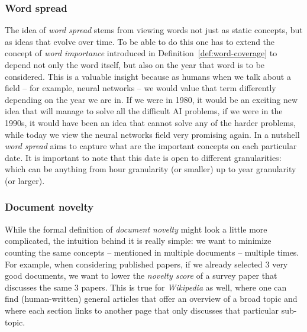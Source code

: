 \subsubsection{Word spread}

The idea of \emph{word spread} stems from viewing words not just as static
concepts, but as ideas that evolve over time.
To be able to do this one has to extend the concept of \emph{word importance}
introduced in Definition~\vref{def:word-coverage} to depend not only the word
itself, but also on the year that word is to be considered.
This is a valuable insight because as humans when we talk about a field -- for
example, neural networks -- we would value that term differently depending on
the year we are in. If we were in 1980, it would be an exciting new idea that
will manage to solve all the difficult \acl{AI} problems, if we were in the
1990s, it would have been an idea that cannot solve any of the harder problems,
while today we view the neural networks field very promising again.
In a nutshell \emph{word spread} aims to capture what are the important
concepts on each particular date. It is important to note that this date is
open to different granularities: which can be anything from hour granularity
(or smaller) up to year granularity (or larger).

\subsubsection{Document novelty}

While the formal definition of \emph{document novelty} might look a little more
complicated, the intuition behind it is really simple: we want to minimize
counting the same concepts -- mentioned in multiple documents -- multiple
times.
For example, when considering published papers, if we already selected \(3\)
very good documents, we want to lower the \emph{novelty score} of a survey
paper that discusses the same \(3\) papers.
This is true for \emph{Wikipedia} as well, where one can find (human-written)
general articles that offer an overview of a broad topic and where each section
links to another page that only discusses that particular sub-topic.

